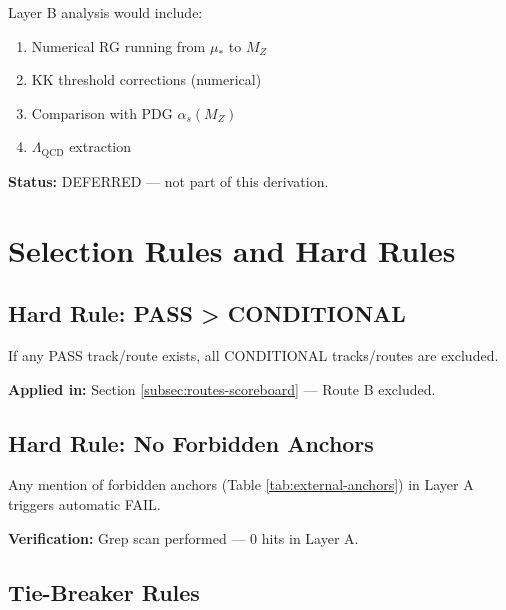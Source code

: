 \documentclass[11pt,a4paper]{article}
\theoremstyle{definition}
\begin{document}
Layer B analysis would include:
\begin{enumerate}
  \item Numerical RG running from $\mu_*$ to $M_Z$
  \item KK threshold corrections (numerical)
  \item Comparison with PDG $\alpha_s(M_Z)$
  \item $\Lambda_{\text{QCD}}$ extraction
\end{enumerate}

\textbf{Status:} DEFERRED --- not part of this derivation.

\section{Selection Rules and Hard Rules}
\label{sec:selection}

\subsection{Hard Rule: PASS > CONDITIONAL}
\label{subsec:hard-rule}

\begin{trapbox}
If any PASS track/route exists, all CONDITIONAL tracks/routes are excluded.
\end{trapbox}

\textbf{Applied in:} Section \ref{subsec:routes-scoreboard} --- Route B excluded.

\subsection{Hard Rule: No Forbidden Anchors}
\label{subsec:hard-forbidden}

\begin{trapbox}
Any mention of forbidden anchors (Table \ref{tab:external-anchors}) in Layer A
triggers automatic FAIL.
\end{trapbox}

\textbf{Verification:} Grep scan performed --- 0 hits in Layer A.

\subsection{Tie-Breaker Rules}
\label{subsec:tie-breaker}
\end{document}
